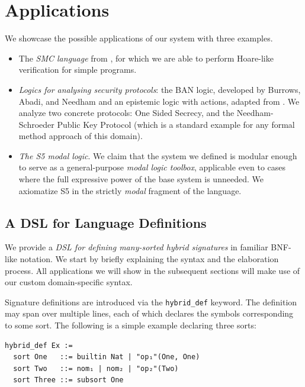 \documentclass{easychair}
\theoremstyle{remark}
\begin{document}
\section{Applications}\label{applications}
We showcase the possible applications of our system with three examples.
\begin{itemize}
\item The \textit{SMC language} from \cite{plotkin, tableaux}, for which we are able to perform  Hoare-like verification for simple programs.
\item \textit{Logics for analysing security protocols}: the BAN logic, developed by Burrows, Abadi, and Needham  \cite{ban} and an epistemic logic with actions, adapted from \cite{ramics}. We analyze two concrete protocols:  One Sided Secrecy, and the Needham-Schroeder Public Key Protocol (which is a standard example for any formal method approach of this domain).
\item \textit{The S5 modal logic}. We claim that the system we defined is modular enough to serve as a general-purpose \textit{modal logic toolbox}, applicable even to cases where the full expressive power of the base system is unneeded. We axiomatize S5 in the strictly \textit{modal} fragment of the language.
\end{itemize}


\subsection{A DSL for Language Definitions}\label{dsl}
We provide a \textit{DSL for defining many-sorted hybrid signatures} in familiar BNF-like notation. We start by briefly explaining the syntax and the elaboration process. All applications we will show in the subsequent sections will make use of our custom domain-specific syntax. 

Signature definitions are introduced via the \lstinline{hybrid_def} keyword. The definition may span over multiple lines, each of which declares the symbols corresponding to some sort. The following is a simple example declaring three sorts:

\begin{lstlisting}
hybrid_def Ex :=
  sort One   ::= builtin Nat | "op₁"(One, One)
  sort Two   ::= nom₁ | nom₂ | "op₂"(Two)
  sort Three ::= subsort One
\end{lstlisting}
\end{document}
